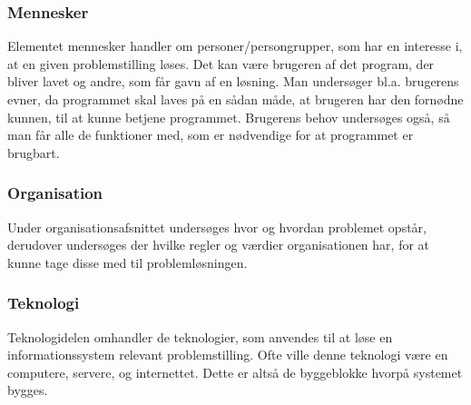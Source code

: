 \subsubsection{Mennesker}\label{subsubsec:mennesker}

Elementet mennesker handler om personer/persongrupper, som har en interesse i, at en given problemstilling
løses. Det kan være brugeren af det program, der bliver lavet og andre, som får gavn af en løsning. Man
undersøger bl.a. brugerens evner, da programmet skal laves på en sådan måde, at brugeren har den
fornødne kunnen, til at kunne betjene programmet. Brugerens behov undersøges også, så man får alle de funktioner
med, som er nødvendige for at programmet er brugbart.


\subsubsection{Organisation}\label{subsubsec:organisation}

Under organisationsafsnittet undersøges hvor og hvordan problemet opstår, derudover undersøges der hvilke regler
og værdier organisationen har, for at kunne tage disse med til problemløsningen.

\cbstart
\subsubsection{Teknologi}\label{subsubsec:Teknologi}

Teknologidelen omhandler de teknologier, som anvendes til at løse en informationssystem relevant problemstilling.
Ofte ville denne teknologi være en computere, servere, og internettet. Dette er altså de byggeblokke hvorpå
systemet bygges.
\cbend



